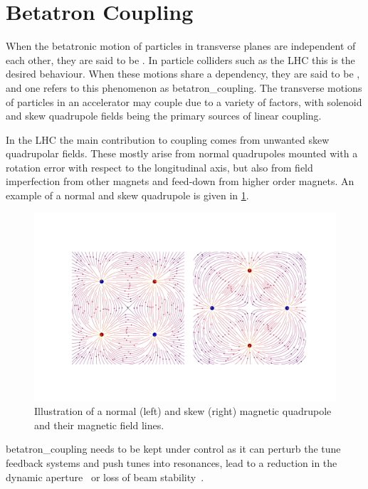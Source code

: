 \section{Betatron Coupling}
\label{section:betatron_coupling}

When the betatronic motion of particles in transverse planes are independent of each other, they are said to be .
In particle colliders such as the LHC this is the desired behaviour.
When these motions share a dependency, they are said to be , and one refers to this phenomenon as \gls{betatron_coupling}.
The transverse motions of particles in an accelerator may couple due to a variety of factors, with solenoid and \gls{skew} quadrupole fields being the primary sources of linear coupling.

In the \gls{LHC} the main contribution to coupling comes from unwanted skew quadrupolar fields.
These mostly arise from normal quadrupoles mounted with a rotation error with respect to the longitudinal axis, but also from field imperfection from other magnets and feed-down from higher order magnets.
An example of a normal and skew quadrupole is given in \cref{figure:normal_vs_skew_quadrupole}.

\begin{figure}[!htb]
    \centering
    \includegraphics[width=\linewidth]{Figures/Beam_Dynamics_Theory/bfield_multipole_order_2.pdf}
    \caption{Illustration of a \gls{normal} (left) and \gls{skew} (right) magnetic quadrupole and their magnetic field lines.}
    \label{figure:normal_vs_skew_quadrupole}
\end{figure}

\Gls{betatron_coupling} needs to be kept under control as it can perturb the tune feedback systems and push tunes into resonances, lead to a reduction in the dynamic aperture~\cite{PA:Ripken:Impact_Linear_Coupling_Nonlinear_Dynamics} or loss of beam stability~\cite{MASTERS:Soubelet:Optics_Octupole_PyHEADTAIL,PRAB:Carver:Transverse_Instabilities_With_Coupling}.

